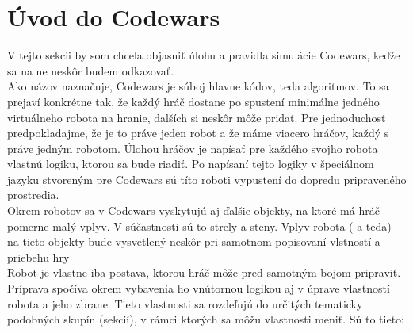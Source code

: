 \section{Úvod do Codewars}
V tejto sekcii by som chcela objasniť úlohu a pravidla simulácie Codewars, keďže sa na ne neskôr budem odkazovať. \\ 
Ako názov naznačuje, Codewars je súboj hlavne kódov, teda algoritmov. To sa prejaví konkrétne tak, že každý hráč dostane po spustení minimálne jedného virtuálneho robota na hranie, dalších si neskôr môže pridať. Pre jednoduchosť predpokladajme, že je to práve jeden robot a že máme viacero hráčov, každý s práve jedným robotom. Úlohou hráčov je napísať pre každého svojho robota vlastnú logiku, ktorou sa bude riadiť. Po napísaní tejto logiky v špeciálnom jazyku stvoreným pre Codewars sú títo roboti vypustení do dopredu pripraveného prostredia. \\
\indent Okrem robotov sa v Codewars vyskytujú aj ďalšie objekty, na ktoré má hráč pomerne malý vplyv. V súčastnosti sú to strely a steny. Vplyv robota ( a teda) na tieto objekty bude vysvetlený neskôr pri samotnom popisovaní vlstností a priebehu hry \\%
\indent Robot je vlastne iba postava, ktorou hráč môže pred samotným bojom pripraviť. Príprava spočíva okrem vybavenia ho vnútornou logikou aj v úprave vlastností robota a jeho zbrane. Tieto vlastnosti sa rozdeľujú do určitých tematicky podobných skupín (sekcií), v rámci ktorých sa môžu vlastnosti meniť. Sú to tieto:
